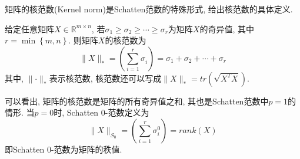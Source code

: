 \documentclass[lang=cn,10pt]{gorgeousnbook}
\numberwithin{equation}{section}%
\numberwithin{figure}{section}%
\begin{document}
矩阵的核范数(Kernel norm)是Schatten范数的特殊形式, 给出核范数的具体定义.
\begin{definition}
给定任意矩阵$X\in \mathbb{R}^{m\times n}$, 若$\sigma _1\ge \sigma _2\ge \cdots \ge \sigma _r$为矩阵$X$的奇异值, 其中$r=\min \left\{ m,n \right\} $. 则矩阵$X$的核范数为
\begin{equation}
\lVert X \rVert _*=\left( \sum_{i=1}^r{\sigma _{i}^{}} \right) =\sigma _1+\sigma _2+\cdots +\sigma _r
\end{equation}
其中, $\lVert \cdot \rVert _*$表示核范数, 核范数还可以写成$\lVert X \rVert _*=tr\left( \sqrt{X^TX} \right) $. 
\end{definition}
可以看出, 矩阵的核范数是矩阵的所有奇异值之和, 其也是Schatten范数中$p=1$的情形. 当$p=0$时, Schatten 0-范数定义为
\begin{equation}
\lVert X \rVert _{S_0}=\left( \sum_{i=1}^r{\sigma _{i}^{0}} \right) =rank\left( X \right) 
\end{equation}
即Schatten 0-范数为矩阵的秩值. 
\end{document}
